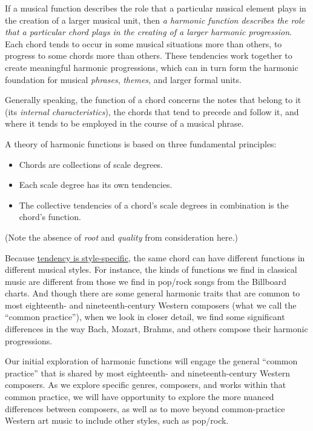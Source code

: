 \documentclass{book}
\providecommand{\tightlist}{%
  \setlength{\itemsep}{0pt}\setlength{\parskip}{0pt}}
\begin{document}
If a musical function describes the role that a particular musical element
plays in the creation of a larger musical unit, then \emph{a harmonic function
describes the role that a particular chord plays in the creating of a larger
harmonic progression}. Each chord tends to occur in some musical situations
more than others, to progress to some chords more than others. These
tendencies work together to create meaningful harmonic progressions, which can
in turn form the harmonic foundation for musical \emph{phrases},
\emph{themes}, and larger formal units.

Generally speaking, the function of a chord concerns the notes that belong to
it (its \emph{internal characteristics}), the chords that tend to precede and
follow it, and where it tends to be employed in the course of a musical
phrase.

A theory of harmonic functions is based on three fundamental principles:

\begin{itemize}
\tightlist
\item
  Chords are collections of scale degrees.\\
\item
  Each scale degree has its own tendencies.\\
\item
  The collective tendencies of a chord's scale degrees in combination is the
  chord's function.
\end{itemize}

(Note the absence of \emph{root} and \emph{quality} from consideration here.)

Because \href{06-intro-harmonic/1-reading-styletendency.html}{tendency is
style-specific}, the same chord can have different functions in different
musical styles. For instance, the kinds of functions we find in classical
music are different from those we find in pop/rock songs from the Billboard
charts. And though there are some general harmonic traits that are common to
most eighteenth- and nineteenth-century Western composers (what we call the
``common practice''), when we look in closer detail, we find some significant
differences in the way Bach, Mozart, Brahms, and others compose their harmonic
progressions.

Our initial exploration of harmonic functions will engage the general ``common
practice'' that is shared by most eighteenth- and nineteenth-century Western
composers. As we explore specific genres, composers, and works within that
common practice, we will have opportunity to explore the more nuanced
differences between composers, as well as to move beyond common-practice
Western art music to include other styles, such as pop/rock.
\end{document}
